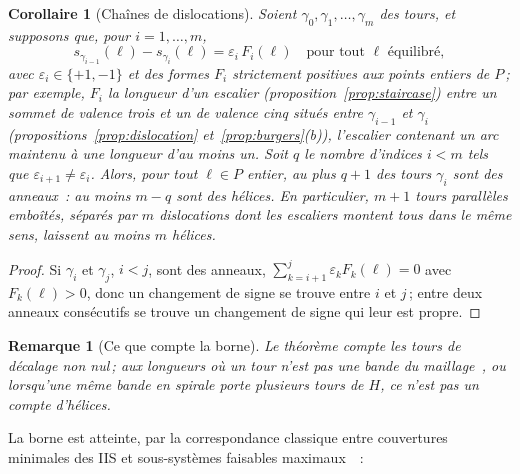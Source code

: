\documentclass[11pt,a4paper]{article}
\newtheorem{corollary}{Corollaire}
\newtheorem{remark}{Remarque}
\newcommand{\shift}{s}
\newcommand{\lean}[1]{\texttt{\detokenize{#1}}}
\newenvironment{evidence}[3][]{}{}
\begin{document}
\begin{evidence}{core}{\lean{sign_change_between}, \lean{chain_of_dislocations}\,; supposé~: les identités entre décalages consécutifs}
\begin{corollary}[Chaînes de dislocations]\label{cor:chain}
Soient $\gamma_0, \gamma_1, \dots, \gamma_m$ des tours, et supposons que,
pour $i = 1, \dots, m$,
\[
  \shift_{\gamma_{i-1}}(\ell) - \shift_{\gamma_i}(\ell) = \varepsilon_i\,
  F_i(\ell) \quad \text{pour tout } \ell \text{ équilibré},
\]
avec $\varepsilon_i \in \{+1, -1\}$ et des formes $F_i$ strictement positives
aux points entiers de $P$\,; par exemple, $F_i$ la longueur d'un escalier
(proposition~\ref{prop:staircase}) entre un sommet de valence trois et un de
valence cinq situés entre $\gamma_{i-1}$ et $\gamma_i$
(propositions~\ref{prop:dislocation} et~\ref{prop:burgers}(b)), l'escalier
contenant un arc maintenu à une longueur d'au moins un. Soit $q$ le nombre
d'indices $i < m$ tels que $\varepsilon_{i+1} \neq \varepsilon_i$. Alors, pour
tout $\ell \in P$ entier, au plus $q + 1$ des tours $\gamma_i$ sont des
anneaux~: au moins $m - q$ sont des hélices. En particulier, $m + 1$ tours
parallèles emboîtés, séparés par $m$ dislocations dont les escaliers montent
tous dans le même sens, laissent au moins $m$ hélices.
\end{corollary}
\end{evidence}

\begin{proof}
Si $\gamma_i$ et $\gamma_j$, $i < j$, sont des anneaux, $\sum_{k=i+1}^{j}
\varepsilon_k F_k(\ell) = 0$ avec $F_k(\ell) > 0$, donc un changement de
signe se trouve entre $i$ et $j$\,; entre deux anneaux consécutifs se trouve
un changement de signe qui leur est propre.
\end{proof}

\begin{remark}[Ce que compte la borne]
Le théorème compte les tours de décalage non nul\,; aux longueurs où un tour
n'est pas une bande du maillage~\cite[prop.~2]{gardent2026loops}, ou
lorsqu'une même bande en spirale porte plusieurs tours de $H$, ce n'est pas un
compte d'hélices.
\end{remark}

La borne est atteinte, par la correspondance classique entre couvertures
minimales des IIS et sous-systèmes faisables
maximaux~\cite{amaldi2003maxfs,parker1996iis}~:
\end{document}
